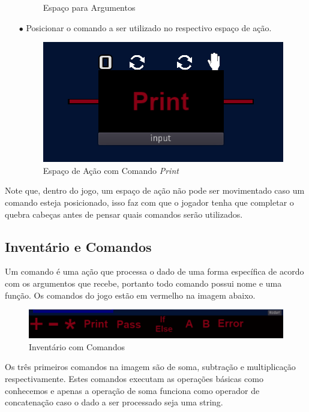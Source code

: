 \begin{itemize}
\begin{figure}[H]
            \caption{Espaço para Argumentos}
        \end{figure}
    \item[$\bullet$]
        Posicionar o comando a ser utilizado no respectivo espaço de ação.
        \begin{figure}[H]
            \includegraphics[scale=0.6]{../figuras/espaco_com_comando.png}
            \caption{Espaço de Ação com Comando \textit{Print}}
        \end{figure}
\end{itemize}

Note que, dentro do jogo, um espaço de ação não pode ser movimentado caso um 
comando esteja posicionado, isso faz com que o jogador tenha que completar o
quebra cabeças antes de pensar quais comandos serão utilizados.

\subsection{Inventário e Comandos}

Um comando é uma ação que processa o dado de uma forma específica de acordo com
os argumentos que recebe, portanto todo comando possui nome e uma função.
Os comandos do jogo estão em vermelho na imagem abaixo.

\begin{figure}[H]
    \includegraphics[scale=0.5]{../figuras/inventario_comandos.png}
    \caption{Inventário com Comandos}
\end{figure}

Os três primeiros comandos na imagem são de soma, subtração e multiplicação
respectivamente. Estes comandos executam as operações básicas como conhecemos e
apenas a operação de soma funciona como operador de concatenação caso o dado a
ser processado seja uma string.

